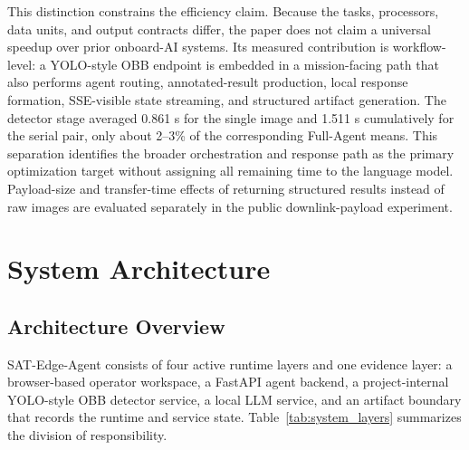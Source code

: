 \documentclass[10pt,letterpaper]{article}
\begin{document}
This distinction constrains the efficiency claim. Because the tasks, processors, data units, and output contracts differ, the paper does not claim a universal speedup over prior onboard-AI systems. Its measured contribution is workflow-level: a YOLO-style OBB endpoint is embedded in a mission-facing path that also performs agent routing, annotated-result production, local response formation, SSE-visible state streaming, and structured artifact generation. The detector stage averaged 0.861 s for the single image and 1.511 s cumulatively for the serial pair, only about 2--3\% of the corresponding Full-Agent means. This separation identifies the broader orchestration and response path as the primary optimization target without assigning all remaining time to the language model. Payload-size and transfer-time effects of returning structured results instead of raw images are evaluated separately in the public downlink-payload experiment.

\section{System Architecture}
\label{sec:architecture}

\subsection{Architecture Overview}

SAT-Edge-Agent consists of four active runtime layers and one evidence layer: a browser-based operator workspace, a FastAPI agent backend, a project-internal YOLO-style OBB detector service, a local LLM service, and an artifact boundary that records the runtime and service state. Table~\ref{tab:system_layers} summarizes the division of responsibility.
\end{document}
